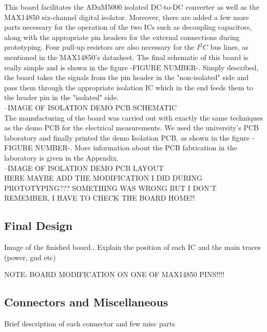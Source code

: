 This board facilitates the ADuM5000 isolated DC-to-DC converter as well as the MAX14850 six-channel digital isolator. Moreover, there are added a few more parts necessary for the operation of the two ICs such as decoupling capacitors, along with the appropriate pin headers for the external connections during prototyping. Four pull-up resistors are also necessary for the $I^2C$ bus lines, as mentioned in the MAX14850's datasheet. The final schematic of this board is really simple and is shown in the figure -FIGURE NUMBER-. Simply described, the board takes the signals from the pin header in the "non-isolated" side and pass them through the appropriate isolation IC which in the end feeds them to the header pin in the "isolated" side.\\

--IMAGE OF ISOLATION DEMO PCB SCHEMATIC \\

The manufacturing of the board was carried out with exactly the same techniques as the demo PCB for the electrical measurements. We used the university's PCB laboratory and finally printed the demo Isolation PCB, as shown in the figure -FIGURE NUMBER-. More information about the PCB fabrication in the laboratory is given in the Appendix.\\

--IMAGE OF ISOLATION DEMO PCB LAYOUT \\

HERE MAYBE ADD THE MODIFICATION I DID DURING PROTOTYPING???
SOMETHING WAS WRONG BUT I DON'T REMEMBER, I HAVE TO CHECK THE BOARD HOME!!


\subsection{Final Design}
Image of the finished board..
Explain the position of each IC and the main traces (power, gnd etc)

NOTE: BOARD MODIFICATION ON ONE OF MAX14850 PINS!!!!


\subsection{Connectors and Miscellaneous}
Brief description of each connector and few misc parts